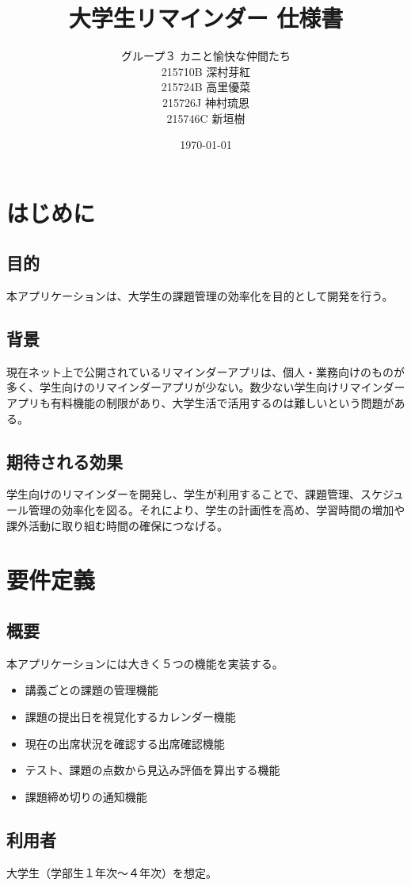\documentclass[a4paper, 11pt, titlepage]{jsarticle}
\title{大学生リマインダー 仕様書}
\author{グループ３ カニと愉快な仲間たち\\215710B 深村芽紅\\215724B 高里優菜\\215726J 神村琉恩\\215746C 新垣樹}
\date{\today }
\begin{document}
\maketitle
\clearpage

\tableofcontents
\clearpage

\section{はじめに}
\subsection{目的}
本アプリケーションは、大学生の課題管理の効率化を目的として開発を行う。
\subsection{背景}
現在ネット上で公開されているリマインダーアプリは、個人・業務向けのものが多く、学生向けのリマインダーアプリが少ない。数少ない学生向けリマインダーアプリも有料機能の制限があり、大学生活で活用するのは難しいという問題がある。
\subsection{期待される効果}
学生向けのリマインダーを開発し、学生が利用することで、課題管理、スケジュール管理の効率化を図る。それにより、学生の計画性を高め、学習時間の増加や課外活動に取り組む時間の確保につなげる。

\section{要件定義}
\subsection{概要}
本アプリケーションには大きく５つの機能を実装する。
\begin{itemize}
\item 講義ごとの課題の管理機能
\item 課題の提出日を視覚化するカレンダー機能
\item 現在の出席状況を確認する出席確認機能
\item テスト、課題の点数から見込み評価を算出する機能
\item 課題締め切りの通知機能
\end{itemize}

\subsection{利用者}
大学生（学部生１年次〜４年次）を想定。
\end{document}
